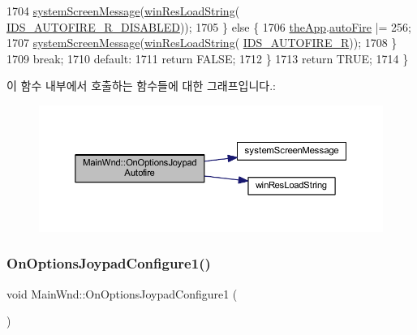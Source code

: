 \begin{DoxyCode}
1704       \mbox{\hyperlink{system_8cpp_a0412545bfaba2004bf7a42d779ea5659}{systemScreenMessage}}(\mbox{\hyperlink{_win_res_util_8cpp_a416e85e80ab9b01376e87251c83d1a5a}{winResLoadString}}(
      \mbox{\hyperlink{resource_8h_ae05b9a7b9e4192682729ceba76db4b5f}{IDS\_AUTOFIRE\_R\_DISABLED}}));
1705     \} \textcolor{keywordflow}{else} \{
1706       \mbox{\hyperlink{_v_b_a_8cpp_a8095a9d06b37a7efe3723f3218ad8fb3}{theApp}}.\mbox{\hyperlink{class_v_b_a_a1a3c37d6609939c821133cf4a2cd9d0d}{autoFire}} |= 256;
1707       \mbox{\hyperlink{system_8cpp_a0412545bfaba2004bf7a42d779ea5659}{systemScreenMessage}}(\mbox{\hyperlink{_win_res_util_8cpp_a416e85e80ab9b01376e87251c83d1a5a}{winResLoadString}}(
      \mbox{\hyperlink{resource_8h_a75010dbd20bd72c30084d2086a6d60ce}{IDS\_AUTOFIRE\_R}}));
1708     \}
1709     \textcolor{keywordflow}{break};
1710   \textcolor{keywordflow}{default}:
1711     \textcolor{keywordflow}{return} FALSE;
1712   \}
1713   \textcolor{keywordflow}{return} TRUE;
1714 \}
\end{DoxyCode}
이 함수 내부에서 호출하는 함수들에 대한 그래프입니다.\+:
\nopagebreak
\begin{figure}[H]
\begin{center}
\leavevmode
\includegraphics[width=350pt]{class_main_wnd_a2b3ef3e8d807f8399870b6a898fbd4e3_cgraph}
\end{center}
\end{figure}
\mbox{\label{class_main_wnd_af3ee3cb477d6492d5a548cf41ad1b16f}} 
\subsubsection{\texorpdfstring{On\+Options\+Joypad\+Configure1()}{OnOptionsJoypadConfigure1()}}
{\footnotesize\ttfamily void Main\+Wnd\+::\+On\+Options\+Joypad\+Configure1 (\begin{DoxyParamCaption}{ }\end{DoxyParamCaption})\hspace{0.3cm}{\ttfamily [protected]}}



